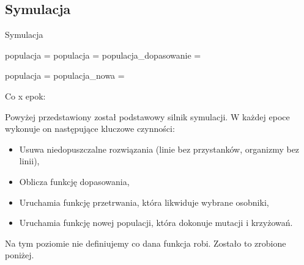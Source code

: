 \documentclass[12pt,a4paper]{article}
\begin{document}
\subsection{Symulacja}
\begin{algorithm}[H]
    \caption{Symulacja}
    \begin{algorithmic}[1]
        \State populacja = 
        \State {}
        \State populacja = 
        \State populacja\_dopasowanie = 

        \State populacja = 
        \State populacja\_nowa =  

        Co x epok:
        \State {}
        \EndFor
        \EndFunction
    \end{algorithmic}
\end{algorithm}

Powyżej przedstawiony został podstawowy silnik symulacji. W każdej epoce wykonuje on następujące kluczowe czynności:
\begin{itemize}
    \item Usuwa niedopuszczalne rozwiązania (linie bez przystanków, organizmy bez linii),
    \item Oblicza funkcję dopasowania,
    \item Uruchamia funkcję przetrwania, która likwiduje wybrane osobniki,
    \item Uruchamia funkcję nowej populacji, która dokonuje mutacji i krzyżowań.
\end{itemize}

Na tym poziomie nie definiujemy co dana funkcja robi. Zostało to zrobione poniżej.
\end{document}
